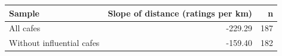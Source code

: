 \begingroup\footnotesize
\begin{tabular}{lrr}
  \toprule
Sample & Slope of distance (ratings per km) & n \\ 
  \midrule
All cafes & -229.29 & 187 \\ 
  Without influential cafes & -159.40 & 182 \\ 
   \bottomrule
\end{tabular}
\endgroup

